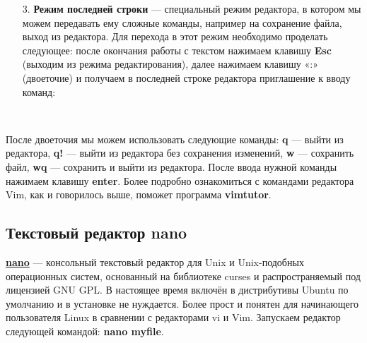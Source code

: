 \documentclass[14pt, a4paper]{article}
\begin{document}
\begin{enumerate}
    \item[3.] \textbf{Режим последней строки} — специальный режим редактора, в котором мы можем передавать
    ему сложные команды, например на сохранение файла, выход из редактора. Для перехода в
    этот режим необходимо проделать следующее: после окончания работы с текстом нажимаем
    клавишу \textbf{Esc} (выходим из режима редактирования), далее нажимаем клавишу «:» (двоеточие)
    и получаем в последней строке редактора приглашение к вводу команд: 
\end{enumerate}

\vspace{-0.5cm}

\begin{figure}[h]
    \centering
    \\ 
    \label{framework} 
\end{figure}

После двоеточия мы можем использовать следующие команды: \textbf{q} — выйти из редактора, \textbf{q!} — выйти
из редактора без сохранения изменений, \textbf{w} — сохранить файл, \textbf{wq} — сохранить и выйти из
редактора. После ввода нужной команды нажимаем клавишу \textbf{enter}. Более подробно ознакомиться с
командами редактора Vim, как и говорилось выше, поможет программа \textbf{vimtutor}.

\subsection*{Текстовый редактор nano} 

\href{https://help.ubuntu.ru/wiki/nano}{\textbf{nano}} — консольный текстовый редактор для Unix и Unix-подобных операционных систем, основанный
на библиотеке curses и распространяемый под лицензией GNU GPL. В настоящее время включён в
дистрибутивы Ubuntu по умолчанию и в установке не нуждается. Более прост и понятен для
начинающего пользователя Linux в сравнении с редакторами vi и Vim. Запускаем редактор следующей
командой: \textbf{nano myfile}.\\

\begin{figure}[h]
    \centering
    \\ 
    \label{framework} 
\end{figure}
\end{document}
